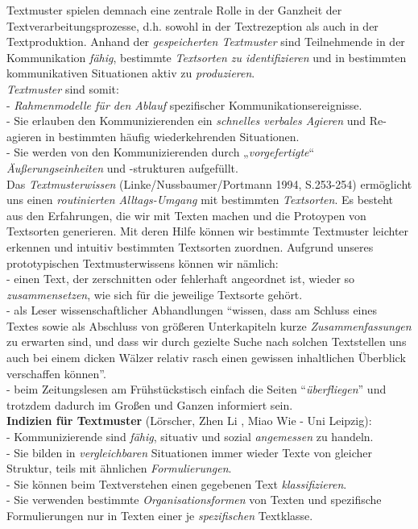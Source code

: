 \documentclass[
  letterpaper,
]{scrbook}
\begin{document}
Textmuster spielen demnach eine zentrale Rolle in der Ganzheit der
Textverarbeitungsprozesse, d.h. sowohl in der Textrezeption als auch in
der Textproduktion. Anhand der \emph{gespeicherten Textmuster} sind
Teilnehmende in der Kommunikation \emph{fähig}, bestimmte
\emph{Textsorten zu identifizieren} und in bestimmten kommunikativen
Situationen aktiv zu \emph{produzieren}.\\

\emph{Textmuster} sind somit:\\
- \emph{Rahmenmodelle für den Ablauf} spezifischer
Kommunikationsereignisse.\\
- Sie erlauben den Kommunizierenden ein \emph{schnelles verbales
Agieren} und Re-agieren in bestimmten häufig wiederkehrenden
Situationen.\\
- Sie werden von den Kommunizierenden durch „\emph{vorgefertigte}``
\emph{Äußerungseinheiten} und -strukturen aufgefüllt.\\

Das \emph{Textmusterwissen} (Linke/Nussbaumer/Portmann 1994, S.253-254)
ermöglicht uns einen \emph{routinierten Alltags-Umgang} mit bestimmten
\emph{Textsorten}. Es besteht aus den Erfahrungen, die wir mit Texten
machen und die Protoypen von Textsorten generieren. Mit deren Hilfe
können wir bestimmte Textmuster leichter erkennen und intuitiv
bestimmten Textsorten zuordnen. Aufgrund unseres prototypischen
Textmusterwissens können wir nämlich:\\
- einen Text, der zerschnitten oder fehlerhaft angeordnet ist, wieder so
\emph{zusammensetzen}, wie sich für die jeweilige Textsorte gehört.\\
- als Leser wissenschaftlicher Abhandlungen ``wissen, dass am Schluss
eines Textes sowie als Abschluss von größeren Unterkapiteln kurze
\emph{Zusammenfassungen} zu erwarten sind, und dass wir durch gezielte
Suche nach solchen Textstellen uns auch bei einem dicken Wälzer relativ
rasch einen gewissen inhaltlichen Überblick verschaffen können''.\\
- beim Zeitungslesen am Frühstückstisch einfach die Seiten
``\emph{überfliegen}'' und trotzdem dadurch im Großen und Ganzen
informiert sein.\\

\textbf{Indizien für Textmuster} (Lörscher, Zhen Li , Miao Wie - Uni
Leipzig):\\
- Kommunizierende sind \emph{fähig}, situativ und sozial
\emph{angemessen} zu handeln.\\
- Sie bilden in \emph{vergleichbaren} Situationen immer wieder Texte von
gleicher Struktur, teils mit ähnlichen \emph{Formulierungen}.\\
- Sie können beim Textverstehen einen gegebenen Text
\emph{klassifizieren}.\\
- Sie verwenden bestimmte \emph{Organisationsformen} von Texten und
spezifische Formulierungen nur in Texten einer je \emph{spezifischen}
Textklasse.\\
\end{document}
